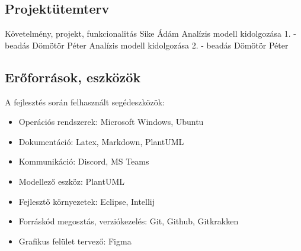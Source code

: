 \documentclass[../../projlab]{subfiles}
\begin{document}
\subsection{Projektütemterv}

\begin{center}
	\begin{terv_v2}
			  {Követelmény, projekt, funkcionalitás}{ Sike Ádám }
			 { Analízis modell kidolgozása 1. - beadás }{ Dömötör Péter } 
			 { Analízis modell kidolgozása 2. - beadás }{ Dömötör Péter }
	\end{terv_v2}
\end{center}

\subsection{Erőforrások, eszközök}
A fejlesztés során felhasznált segédeszközök:
\begin{itemize}
	\item Operációs rendszerek: Microsoft Windows, Ubuntu
	\item Dokumentáció: Latex, Markdown, PlantUML
	\item Kommunikáció: Discord, MS Teams
	\item Modellező eszköz: PlantUML
	\item Fejlesztő környezetek: Eclipse, Intellij
	\item Forráskód megosztás, verziókezelés: Git, Github, Gitkrakken
	\item Grafikus felület tervező: Figma
\end{itemize}


\clearpage
\end{document}
